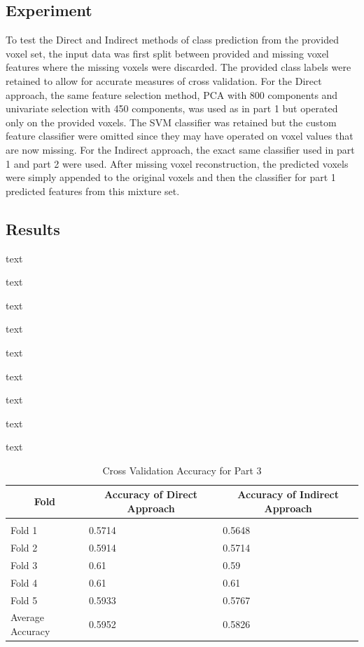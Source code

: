 \documentclass{article} %
\begin{document}
\subsection{Experiment}
To test the Direct and Indirect methods of class prediction from the provided voxel set, the input data was first split between provided and missing voxel features where the missing voxels were discarded.  The provided class labels were retained to allow for accurate measures of cross validation.  For the Direct approach, the same feature selection method, PCA with 800 components and univariate selection with 450 components, was used as in part 1 but operated only on the provided voxels. The SVM classifier was retained but the custom feature classifier were omitted since they may have operated on voxel values that are now missing. For the Indirect approach, the exact same classifier used in part 1 and part 2 were used. After missing voxel reconstruction, the predicted voxels were simply appended to the original voxels and then the classifier for part 1 predicted features from this mixture set.


\subsection{Results}
text

text

text

text

text

text

text

text

text

\begin{table}[h]
\caption{Cross Validation Accuracy for Part 3}
\label{classtable}
\begin{center}
	\begin{tabular}{lll}
		\multicolumn{1}{c}{\bf Fold}  &\multicolumn{1}{c}{\bf Accuracy of Direct Approach} &\multicolumn{1}{c}{\bf Accuracy of Indirect Approach} 
		\\ \hline \\
		Fold 1   &0.5714 &0.5648 \\
		Fold 2   &0.5914 &0.5714 \\
		Fold 3   &0.61 &0.59 \\
		Fold 4   &0.61   &0.61 \\
		Fold 5   &0.5933   &0.5767 \\
		Average Accuracy   &0.5952 &0.5826\\
	\end{tabular}
\end{center}
\end{table} 
\end{document}
